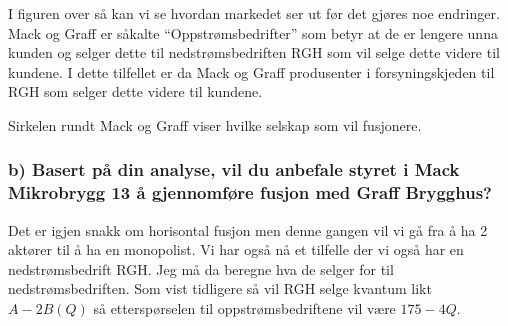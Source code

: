 \documentclass[
  12pt,
  a4paper,
  DIV=11,
  numbers=noendperiod]{scrartcl}
\begin{document}

I figuren over så kan vi se hvordan markedet ser ut før det gjøres noe
endringer. Mack og Graff er såkalte ``Oppstrømsbedrifter'' som betyr at
de er lengere unna kunden og selger dette til nedstrømsbedriften RGH som
vil selge dette videre til kundene. I dette tilfellet er da Mack og
Graff produsenter i forsyningskjeden til RGH som selger dette videre til
kundene.

Sirkelen rundt Mack og Graff viser hvilke selskap som vil fusjonere.

\clearpage

\subsubsection{b) Basert på din analyse, vil du anbefale styret i Mack
Mikrobrygg 13 å gjennomføre fusjon med Graff
Brygghus?}\label{b-basert-puxe5-din-analyse-vil-du-anbefale-styret-i-mack-mikrobrygg-13-uxe5-gjennomfuxf8re-fusjon-med-graff-brygghus}

Det er igjen snakk om horisontal fusjon men denne gangen vil vi gå fra å
ha 2 aktører til å ha en monopolist. Vi har også nå et tilfelle der vi
også har en nedstrømsbedrift RGH. Jeg må da beregne hva de selger for
til nedstrømsbedriften. Som vist tidligere så vil RGH selge kvantum likt
\(A-2B(Q)\) så etterspørselen til oppstrømsbedriftene vil være
\(175-4Q\).
\end{document}
